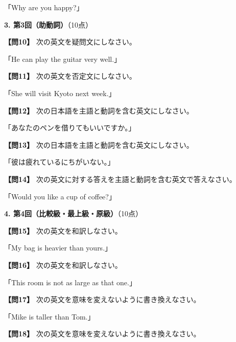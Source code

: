 \noindent「Why are you happy?」

\testqsep

\noindent\textbf{3. 第3回（助動詞）}（10点）

\testquestion
\noindent\textbf{【問10】} 次の英文を疑問文にしなさい。

\noindent「He can play the guitar very well.」

\testqsep
\testquestion
\noindent\textbf{【問11】} 次の英文を否定文にしなさい。

\noindent「She will visit Kyoto next week.」

\testqsep
\testquestion
\noindent\textbf{【問12】} 次の日本語を主語と動詞を含む英文にしなさい。

\noindent「あなたのペンを借りてもいいですか。」

\testqsep
\testquestion
\noindent\textbf{【問13】} 次の日本語を主語と動詞を含む英文にしなさい。

\noindent「彼は疲れているにちがいない。」

\testqsep
\testquestion
\noindent\textbf{【問14】} 次の英文に対する答えを主語と動詞を含む英文で答えなさい。

\noindent「Would you like a cup of coffee?」

\testqsep
\newpage

\noindent\textbf{4. 第4回（比較級・最上級・原級）}（10点）

\testquestion
\noindent\textbf{【問15】} 次の英文を和訳しなさい。

\noindent「My bag is heavier than yours.」

\testqsep

\testquestion
\noindent\textbf{【問16】} 次の英文を和訳しなさい。

\noindent「This room is not as large as that one.」

\testqsep
\testquestion
\noindent\textbf{【問17】} 次の英文を意味を変えないように書き換えなさい。

\noindent「Mike is taller than Tom.」

\testqsep
\testquestion
\noindent\textbf{【問18】} 次の英文を意味を変えないように書き換えなさい。

